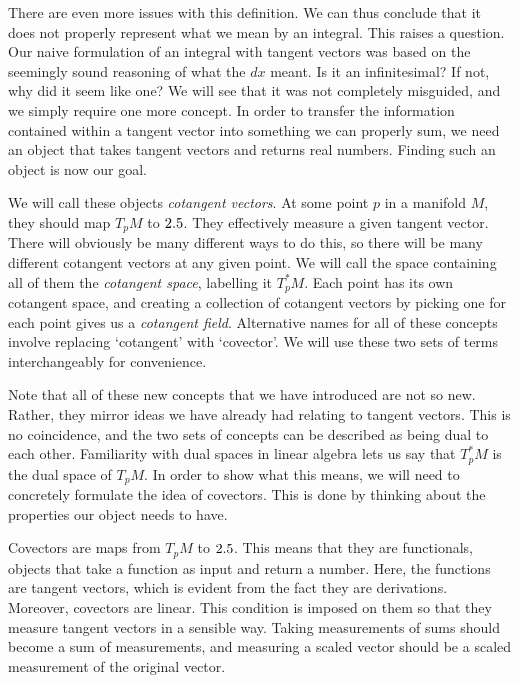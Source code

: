 \documentclass[a4paper,12pt]{article}
\begin{document}
There are even more issues with this definition.
We can thus conclude that it does not properly represent what we mean by an integral.
This raises a question.
Our naive formulation of an integral with tangent vectors was based on the seemingly sound reasoning of what the $dx$ meant.
Is it an infinitesimal?
If not, why did it seem like one?
We will see that it was not completely misguided, and we simply require one more concept.
In order to transfer the information contained within a tangent vector into something we can properly sum, we need an object that takes tangent vectors and returns real numbers.
Finding such an object is now our goal.

We will call these objects \emph{cotangent vectors}.
At some point $p$ in a manifold $M$, they should map $T_p M$ to $2.5$.
They effectively measure a given tangent vector.
There will obviously be many different ways to do this, so there will be many different cotangent vectors at any given point.
We will call the space containing all of them the \emph{cotangent space}, labelling it $T^*_p M$.
Each point has its own cotangent space, and creating a collection of cotangent vectors by picking one for each point gives us a \emph{cotangent field}.
Alternative names for all of these concepts involve replacing `cotangent' with `covector'.
We will use these two sets of terms interchangeably for convenience.

Note that all of these new concepts that we have introduced are not so new.
Rather, they mirror ideas we have already had relating to tangent vectors.
This is no coincidence, and the two sets of concepts can be described as being dual to each other.
Familiarity with dual spaces in linear algebra lets us say that $T^*_p M$ is the dual space of $T_p M$.
In order to show what this means, we will need to concretely formulate the idea of covectors.
This is done by thinking about the properties our object needs to have.

Covectors are maps from $T_p M$ to $2.5$.
This means that they are functionals, objects that take a function as input and return a number.
Here, the functions are tangent vectors, which is evident from the fact they are derivations.
Moreover, covectors are linear.
This condition is imposed on them so that they measure tangent vectors in a sensible way.
Taking measurements of sums should become a sum of measurements, and measuring a scaled vector should be a scaled measurement of the original vector.
\end{document}
